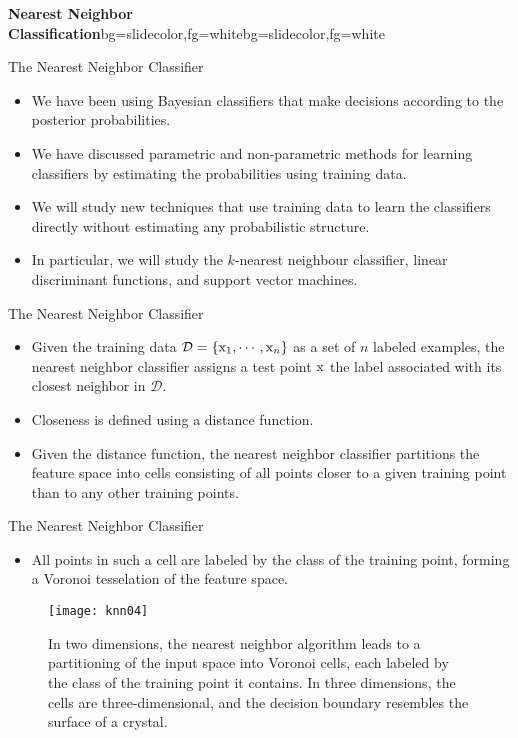 \begin{frame}{}
\begin{variableblock}{\centering \Large \textbf{\vspace{4pt}\newline Nearest Neighbor Classification\vspace{4pt}}}{bg=slidecolor,fg=white}{bg=slidecolor,fg=white}
\end{variableblock}
\end{frame}

\begin{frame}{The Nearest Neighbor Classifier}
\begin{itemize}
\item We have been using Bayesian classifiers that make decisions according to the posterior probabilities.
􏰂\item We have discussed parametric and non-parametric methods for learning classifiers by estimating the probabilities using training data.
􏰂\item We will study new techniques that use training data to learn the classifiers directly without estimating any probabilistic structure.
􏰂\item In particular, we will study the $k$-nearest neighbour classifier, linear discriminant functions, and support vector machines.
\end{itemize}
\end{frame}

\begin{frame}{The Nearest Neighbor Classifier}
\begin{itemize}
\item Given the training data $\mathcal{D} = \{{\rm x}_1,\cdots,{\rm x}_n\}$ as a set of $n$ labeled examples, the {\color{mycolor2}nearest neighbor classifier} assigns a test point ${\rm x}$ the label associated with its closest neighbor in $\mathcal{D}$.
􏰂\item Closeness is defined using a distance function.
􏰂\item Given the distance function, the nearest neighbor classifier partitions the feature space into cells consisting of all points closer to a given training point than to any other training points.
\end{itemize}
\end{frame}

\begin{frame}{The Nearest Neighbor Classifier}
\begin{itemize}
\item All points in such a cell are labeled by the class of the training point, forming a {\color{mycolor2} Voronoi tesselation} of the feature space.
\end{itemize}
\begin{figure}
\texttt{[image: knn04]}
\caption{In two dimensions, the nearest neighbor algorithm leads to a partitioning of the input space into Voronoi cells, each labeled by the class of the training point it contains. In three dimensions, the cells are three-dimensional, and the decision boundary resembles the surface of a crystal.}
\end{figure}
\end{frame}

